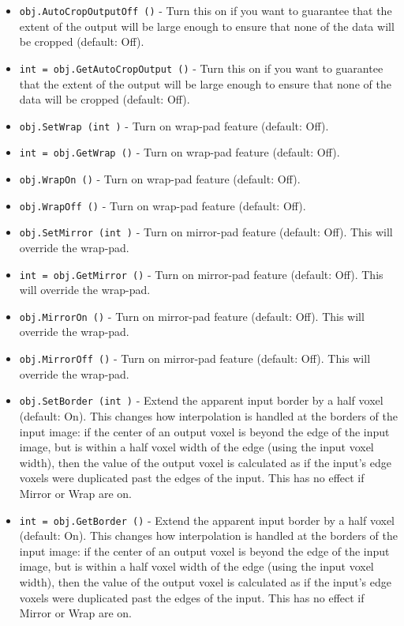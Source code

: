 \begin{itemize}
\item  \verb|obj.AutoCropOutputOff ()| -  Turn this on if you want to guarantee that the extent of the
 output will be large enough to ensure that none of the 
 data will be cropped (default: Off).

\item  \verb|int = obj.GetAutoCropOutput ()| -  Turn this on if you want to guarantee that the extent of the
 output will be large enough to ensure that none of the 
 data will be cropped (default: Off).

\item  \verb|obj.SetWrap (int )| -  Turn on wrap-pad feature (default: Off).

\item  \verb|int = obj.GetWrap ()| -  Turn on wrap-pad feature (default: Off).

\item  \verb|obj.WrapOn ()| -  Turn on wrap-pad feature (default: Off).

\item  \verb|obj.WrapOff ()| -  Turn on wrap-pad feature (default: Off).

\item  \verb|obj.SetMirror (int )| -  Turn on mirror-pad feature (default: Off).
 This will override the wrap-pad. 

\item  \verb|int = obj.GetMirror ()| -  Turn on mirror-pad feature (default: Off).
 This will override the wrap-pad. 

\item  \verb|obj.MirrorOn ()| -  Turn on mirror-pad feature (default: Off).
 This will override the wrap-pad. 

\item  \verb|obj.MirrorOff ()| -  Turn on mirror-pad feature (default: Off).
 This will override the wrap-pad. 

\item  \verb|obj.SetBorder (int )| -  Extend the apparent input border by a half voxel (default: On).
 This changes how interpolation is handled at the borders of the
 input image: if the center of an output voxel is beyond the edge
 of the input image, but is within a half voxel width of the edge
 (using the input voxel width), then the value of the output voxel
 is calculated as if the input's edge voxels were duplicated past
 the edges of the input.
 This has no effect if Mirror or Wrap are on.

\item  \verb|int = obj.GetBorder ()| -  Extend the apparent input border by a half voxel (default: On).
 This changes how interpolation is handled at the borders of the
 input image: if the center of an output voxel is beyond the edge
 of the input image, but is within a half voxel width of the edge
 (using the input voxel width), then the value of the output voxel
 is calculated as if the input's edge voxels were duplicated past
 the edges of the input.
 This has no effect if Mirror or Wrap are on.


\end{itemize}
